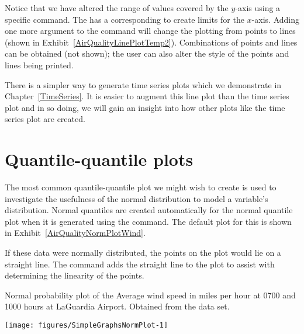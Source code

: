  
Notice that we have altered the range of values covered by the $y$-axis using a specific command. The  has a corresponding  to create limits for the $x$-axis. Adding one more argument to the  command will change the plotting from points to lines (shown in Exhibit~\ref{AirQualityLinePlotTemp2}). Combinations of points and lines can be obtained (not shown); the user can also alter the style of the points and lines being printed. 
 
There is a simpler way to generate time series plots which we demonstrate in Chapter~\ref{TimeSeries}. It is easier to augment this line plot than the time series plot and in so doing, we will gain an insight into how other plots like the time series plot are created. 
 
 
\section{Quantile-quantile plots} 
 
The most common quantile-quantile plot we might wish to create is used to investigate the usefulness of the normal distribution to model a variable's distribution. Normal quantiles are created automatically for the normal quantile plot when it is generated using the  command. The default plot for this is shown in Exhibit~\ref{AirQualityNormPlotWind}. 
 
If these data were normally distributed, the points on the plot would lie on a straight line. The  command adds the straight line to the plot to assist with determining the linearity of the points. 
 
\begin{exhibit} 
\begin{center} 
\caption{Normal probability plot of the Average wind speed in miles per hour at 0700 and 1000 hours at LaGuardia Airport. Obtained from the  data set.} 
\label{AirQualityNormPlotWind} 
\begin{knitrout}
\color{fgcolor}\begin{kframe}
\begin{alltt}
\hlstd{> }
\hlstd{> }
\end{alltt}
\end{kframe}
\texttt{[image: figures/SimpleGraphsNormPlot-1]} 

\end{knitrout}
\end{center} 
\end{exhibit} 
 
